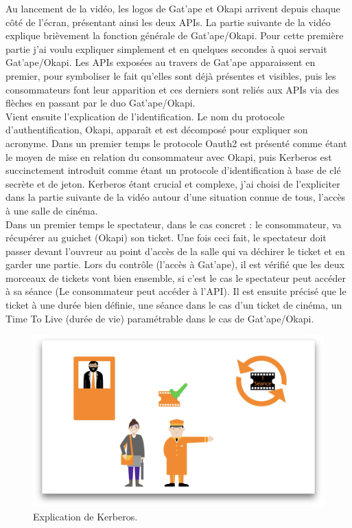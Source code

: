 Au lancement de la vidéo, les logos de Gat'ape et Okapi arrivent depuis chaque côté de l'écran, présentant ainsi les deux APIs. La partie suivante de la vidéo explique brièvement la fonction générale de Gat'ape/Okapi. Pour cette première partie j'ai voulu expliquer simplement et en quelques secondes à quoi servait Gat'ape/Okapi. Les APIs exposées au travers de Gat'ape apparaissent en premier, pour symboliser le fait qu'elles sont déjà présentes et visibles, puis les consommateurs font leur apparition et ces derniers sont reliés aux APIs via des flèches en passant par le duo Gat'ape/Okapi.\\

Vient ensuite l'explication de l'identification. Le nom du protocole d'authentification, Okapi, apparaît et est décomposé pour expliquer son acronyme. Dans un premier temps le protocole Oauth2 est présenté comme étant le moyen de mise en relation du consommateur avec Okapi,  puis Kerberos est succinctement introduit comme étant un protocole d'identification à base de clé secrète et de jeton. Kerberos étant crucial et complexe, j'ai choisi de l'expliciter dans la partie suivante de la vidéo autour d'une situation connue de tous, l'accès à une salle de cinéma.\\

Dans un premier temps le spectateur, dans le cas concret : le consommateur, va récupérer au guichet (Okapi) son ticket. Une fois ceci fait, le spectateur doit passer devant l'ouvreur au point d'accès de la salle qui va déchirer le ticket et en garder une partie. Lors du contrôle (l'accès à Gat'ape), il est vérifié que les deux morceaux de tickets vont bien ensemble, si c'est le cas le spectateur peut accéder à sa séance (Le consommateur peut accéder à l'API). Il est ensuite précisé que le ticket à une durée bien définie, une séance dans le cas d'un ticket de cinéma, un Time To Live (durée de vie) paramétrable dans le cas de Gat'ape/Okapi.\\

\begin{figure}[htp]
  \centering
  \includegraphics[width=15cm]{images/gao/screenGao}
  \caption{Explication de Kerberos.}
  \label{screengatape}
\end{figure}

